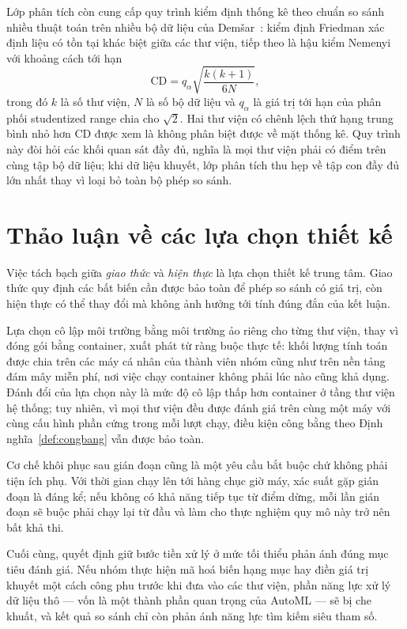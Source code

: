 Lớp phân tích còn cung cấp quy trình kiểm định thống kê theo chuẩn so sánh nhiều
thuật toán trên nhiều bộ dữ liệu của Dem\v{s}ar~\cite{demsar2006statistical}:
kiểm định Friedman xác định liệu có tồn tại khác biệt giữa các thư viện, tiếp theo
là hậu kiểm Nemenyi với khoảng cách tới hạn
\[
    \mathrm{CD} = q_{\alpha}\sqrt{\frac{k(k+1)}{6N}},
\]
trong đó $k$ là số thư viện, $N$ là số bộ dữ liệu và $q_{\alpha}$ là giá trị tới
hạn của phân phối studentized range chia cho $\sqrt{2}$. Hai thư viện có chênh
lệch thứ hạng trung bình nhỏ hơn $\mathrm{CD}$ được xem là không phân biệt được về
mặt thống kê. Quy trình này đòi hỏi các khối quan sát đầy đủ, nghĩa là mọi thư
viện phải có điểm trên cùng tập bộ dữ liệu; khi dữ liệu khuyết, lớp phân tích thu
hẹp về tập con đầy đủ lớn nhất thay vì loại bỏ toàn bộ phép so sánh.

\section{Thảo luận về các lựa chọn thiết kế}
\label{sec:thaoluan-pp}
Việc tách bạch giữa \emph{giao thức} và \emph{hiện thực} là lựa chọn thiết kế
trung tâm. Giao thức quy định các bất biến cần được bảo toàn để phép so sánh có
giá trị, còn hiện thực có thể thay đổi mà không ảnh hưởng tới tính đúng đắn của
kết luận.

Lựa chọn cô lập môi trường bằng môi trường ảo riêng cho từng thư viện, thay vì
đóng gói bằng container, xuất phát từ ràng buộc thực tế: khối lượng tính toán được
chia trên các máy cá nhân của thành viên nhóm cũng như trên nền tảng đám mây miễn
phí, nơi việc chạy container không phải lúc nào cũng khả dụng. Đánh đổi của lựa
chọn này là mức độ cô lập thấp hơn container ở tầng thư viện hệ thống; tuy nhiên,
vì mọi thư viện đều được đánh giá trên cùng một máy với cùng cấu hình phần cứng
trong mỗi lượt chạy, điều kiện công bằng theo Định nghĩa~\ref{def:congbang} vẫn
được bảo toàn.

Cơ chế khôi phục sau gián đoạn cũng là một yêu cầu bắt buộc chứ không phải tiện
ích phụ. Với thời gian chạy lên tới hàng chục giờ máy, xác suất gặp gián đoạn là
đáng kể; nếu không có khả năng tiếp tục từ điểm dừng, mỗi lần gián đoạn sẽ buộc
phải chạy lại từ đầu và làm cho thực nghiệm quy mô này trở nên bất khả thi.

Cuối cùng, quyết định giữ bước tiền xử lý ở mức tối thiểu phản ánh đúng mục tiêu
đánh giá. Nếu nhóm thực hiện mã hoá biến hạng mục hay điền giá trị khuyết một cách
công phu trước khi đưa vào các thư viện, phần năng lực xử lý dữ liệu thô --- vốn
là một thành phần quan trọng của AutoML --- sẽ bị che khuất, và kết quả so sánh
chỉ còn phản ánh năng lực tìm kiếm siêu tham số.

